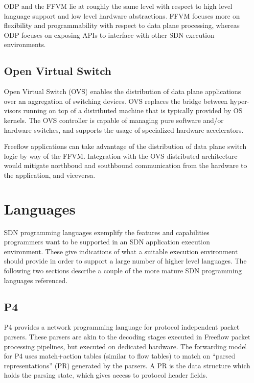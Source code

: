 ODP and the FFVM lie at roughly the same level with respect to high level language support and low level hardware abstractions. FFVM focuses more on flexibility and programmability with respect to data plane processing, whereas ODP focuses on exposing APIs to interface with other SDN execution environments.

\subsection{Open Virtual Switch}
\label{related:ovs}
Open Virtual Switch (OVS) \cite{ovs} enables the distribution of data
plane applications over an aggregation of switching devices. OVS replaces
the bridge between hyper-visors running on top of a distributed machine that
is typically provided by OS kernels. The OVS controller is capable of managing
pure software and/or hardware switches, and supports the usage of specialized
hardware accelerators. 

Freeflow applications can take advantage of the distribution of data plane switch logic by way of the FFVM. Integration with the OVS distributed architecture would mitigate northboud and southbound communication from the hardware to the application, and viceversa.

\section{Languages}
\label{related:lang}
SDN programming languages exemplify the features and capabilities programmers
want to be supported in an SDN application execution environment. These give
indications of what a suitable execution environment should provide in order
to support a large number of higher level languages. The following two sections
describe a couple of the more mature SDN programming languages referenced.

\subsection{P4}
\label{related:p4}
P4 \cite{p4} provides a network programming language for protocol independent
packet parsers. These parsers are akin to the decoding stages executed in
Freeflow packet processing pipelines, but executed on dedicated hardware. The
forwarding model for P4 uses match+action tables (similar to flow tables) to
match on ``parsed representations'' (PR) generated by the parsers. A PR is the
data structure which holds the parsing state, which gives access to protocol
header fields. 

